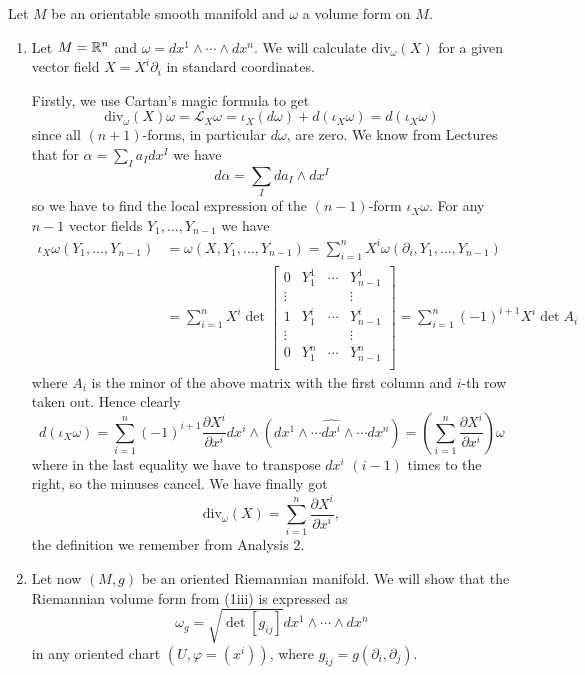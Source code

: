 \documentclass[a4paper, 12pt]{article}
\begin{document}
\begin{Exercise}
    Let $M$ be an orientable smooth manifold and $\omega$ a volume form on $M$.
    \begin{enumerate}[label=(\roman*)]
        \item Let $M = \mathbb{R}^n$ and $\omega = dx^1\wedge\cdots\wedge dx^n$.
            We will calculate $\text{div}_\omega(X)$ for a given vector field $X = X^i\partial_i$ in standard coordinates.

            Firstly, we use Cartan's magic formula to get
            \[
                \text{div}_\omega(X)\omega = \mathcal{L}_X\omega = \iota_X(d\omega) + d(\iota_X \omega) = d(\iota_X \omega)
            \]
            since all $(n+1)$-forms, in particular $d\omega$, are zero.
            We know from Lectures that for $\alpha = \sum_{I}a_Idx^I$ we have
            \[
                d\alpha = \sum_{I} da_I\wedge dx^I
            \]
            so we have to find the local expression of the $(n-1)$-form $\iota_X\omega$.
            For any $n-1$ vector fields $Y_1,\dots,Y_{n-1}$ we have
            \begin{align*}
                \iota_X\omega(Y_1,\dots,Y_{n-1})
                &= \omega(X, Y_1,\dots,Y_{n-1})
                = \sum_{i = 1}^{n}X^i\omega(\partial_i,Y_1,\dots,Y_{n-1}) \\
                &= \sum_{i = 1}^{n}X^i \det
                \begin{bmatrix}
                    0 & Y_1^1 & \cdots & Y_{n-1}^1 \\
                    \vdots &  & & \vdots \\
                    1 & Y_1^i & \cdots & Y_{n-1}^i \\
                    \vdots &  & & \vdots \\
                    0 & Y_1^n & \cdots & Y_{n-1}^n \\
                \end{bmatrix}
                = \sum_{i=1}^{n}(-1)^{i+1}X^i \det A_i
            \end{align*}
            where $A_i$ is the minor of the above matrix with the first column and $i$-th row taken out.
            Hence clearly
            \[
                d(\iota_X\omega)
                = \sum_{i=1}^{n}(-1)^{i+1}\frac{\partial X^i}{\partial x^i}dx^i\wedge (dx^1\wedge \cdots \hat{dx^i}\wedge\cdots dx^n)
                = \left( \sum_{i=1}^{n}\frac{\partial X^i}{\partial x^i} \right) \omega
            \]
            where in the last equality we have to transpose $dx^i$ $(i-1)$ times to the right, so the minuses cancel.
            We have finally got
            \[
                \text{div}_\omega(X) = \sum_{i=1}^{n}\frac{\partial X^i}{\partial x^i},
            \]
            the definition we remember from Analysis 2.
        \item Let now $(M, g)$ be an oriented Riemannian manifold.
            We will show that the Riemannian volume form from (1iii) is expressed as
            \[
                \omega_g = \sqrt{\det[g_{ij}]}dx^1 \wedge \cdots \wedge dx^n
            \]
            in any oriented chart $(U, \varphi = (x^i))$, where $g_{ij} = g(\partial_i, \partial_j)$.


\end{enumerate}
\end{Exercise}
\end{document}
